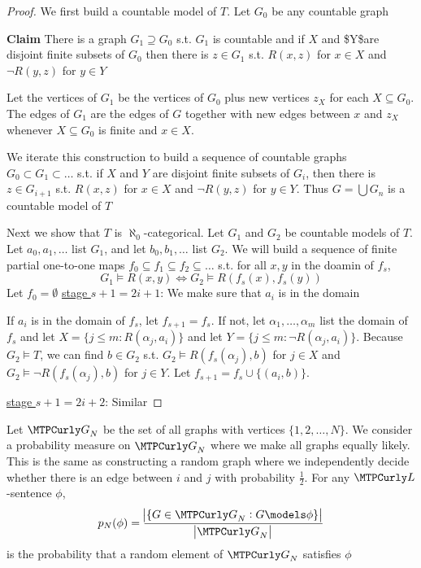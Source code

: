 \documentclass[11pt]{article}
\begin{document}
\begin{proof}
We first build a countable model of \(T\). Let \(G_0\) be any countable graph

\textbf{Claim} There is a graph \(G_1\supseteq G_0\) s.t. \(G_1\) is countable and if
\(X\) and \$Y\$are disjoint finite subsets of \(G_0\) then there is 
\(z\in G_1\) s.t. \(R(x,z)\) for \(x\in X\) and \(\neg R(y,z)\) for \(y\in
    Y\)

Let the vertices of \(G_1\) be the vertices of \(G_0\) plus new vertices
\(z_X\) for each \(X\subseteq G_0\). The edges of \(G_1\) are the edges of
\(G\) together  with new edges between \(x\) and \(z_X\) whenever 
\(X\subseteq G_0\) is finite and \(x\in X\).

We iterate this construction to build a sequence of countable graphs 
\(G_0\subset G_1\subset\dots\) s.t. if \(X\) and \(Y\) are disjoint finite
subsets of \(G_i\), then there is \(z\in G_{i+1}\) s.t. \(R(x,z)\) for
\(x\in X\) and \(\neg R(y,z)\) for \(y\in Y\). Thus \(G=\bigcup G_n\) is a
countable model of \(T\)

Next we show that \(T\) is \(\aleph_0\)-categorical. Let \(G_1\) and \(G_2\)
be countable models of \(T\). Let \(a_0,a_1,\dots\) list \(G_1\), and let
\(b_0,b_1,\dots\) list \(G_2\). We will build a sequence of finite partial
one-to-one maps \(f_0\subseteq f_1\subseteq f_2\subseteq\dots\) s.t. for all
\(x,y\) in the doamin of \(f_s\),
\begin{equation*}
G_1\models R(x,y)\Leftrightarrow G_2\models R(f_s(x),f_s(y))
\end{equation*}
Let \(f_0=\emptyset\)
\uline{stage \(s+1=2i+1\)}: We make sure that \(a_i\) is in the domain

If \(a_i\) is in the domain of \(f_s\), let \(f_{s+1}=f_s\). If not, let
\(\alpha_1,\dots,\alpha_m\) list the domain of \(f_s\) and let 
\(X=\{j\le m:R(\alpha_j,a_i)\}\) and let \(Y=\{j\le m:\neg
    R(\alpha_j,a_i)\}\). Because 
\(G_2\models T\), we can find \(b\in G_2\) s.t. \(G_2\models
    R(f_s(\alpha_j),b)\) for \(j\in X\) and 
\(G_2\models\neg R(f_s(\alpha_j),b)\) for \(j\in Y\). Let
\(f_{s+1}=f_s\cup\{(a_i,b)\}\). 

\uline{stage \(s+1=2i+2\)}: Similar
\end{proof}

Let \(\calg_N\) be the set of all graphs with vertices \(\{1,2,\dots,N\}\).
We consider a probability measure on \(\calg_N\) where we make all graphs
equally likely. This is the same as constructing a random graph where we
independently decide whether there is an edge between \(i\) and \(j\) with
probability \(\frac{1}{2}\). For any \(\call\)-sentence \(\phi\),
\begin{equation*}
p_N(\phi)=\frac{\abs{\{G\in\calg_N:G\models\phi\}}}{\abs{\calg_N}}
\end{equation*}
is the probability that a random element of \(\calg_N\) satisfies \(\phi\)
\end{document}
